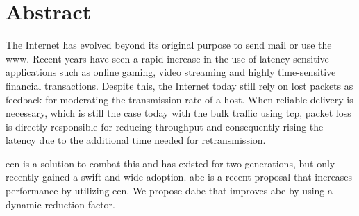 \chapter*{Abstract}

The Internet has evolved beyond its original purpose to send mail or use the \gls{www}. Recent years have seen a rapid increase in the use of latency sensitive applications such as online gaming, video streaming and highly time-sensitive financial transactions. Despite this, the Internet today still rely on lost packets as feedback for moderating the transmission rate of a host. When reliable delivery is necessary, which is still the case today with the bulk traffic using \gls{tcp}, packet loss is directly responsible for reducing throughput and consequently rising the latency due to the additional time needed for retransmission.

\gls{ecn} is a solution to combat this and has existed for two generations, but only recently gained a swift and wide adoption. \gls{abe} is a recent proposal that increases performance by utilizing \gls{ecn}. We propose \gls{dabe} that improves \gls{abe} by using a dynamic reduction factor.